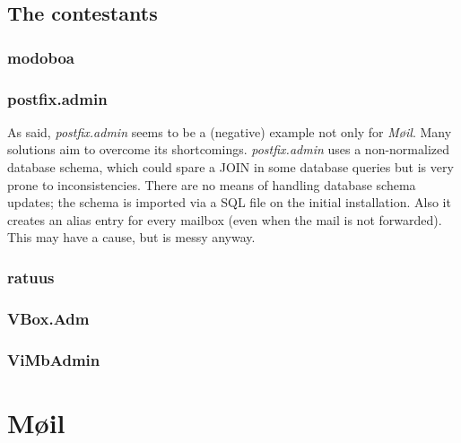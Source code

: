 \documentclass[12pt,a4paper]{scrartcl}
\begin{document}
		\subsection*{The contestants}
			\subsubsection*{modoboa}

			\label{sec:contestants:postfix.admin}
			\subsubsection*{postfix.admin}

				As said, \emph{postfix.admin} seems to be a (negative) example
				not only for \emph{Møil}. Many solutions aim to overcome its
				shortcomings. \emph{postfix.admin} uses a non-normalized
				\cite{dbnorm} database schema, which could spare a JOIN in some
				database queries but is very prone to inconsistencies. There
				are no means of handling database schema updates; the schema is
				imported via a \ac{SQL} file on the initial installation. Also
				it creates an alias entry for every mailbox (even when the mail
				is not forwarded). This may have a cause, but is messy anyway.

			\subsubsection*{ratuus}

			\subsubsection*{VBox.Adm}

			\subsubsection*{ViMbAdmin}

	\section*{Møil}
\end{document}
